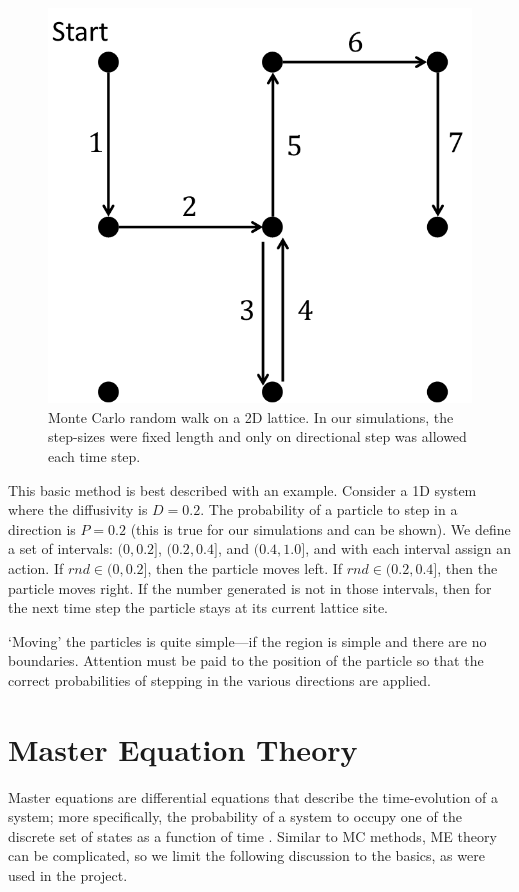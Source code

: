 	\begin{figure}[h]
		\centering
		\includegraphics[width=0.5\linewidth]{../images/mc-random-walk}
		\caption[Monte Carlo random walk on a 2D lattice]{Monte Carlo random walk on a 2D lattice. In our simulations, the step-sizes were fixed length and only on directional step was allowed each time step.}
		\label{fig:mc-random-walk}
	\end{figure}

	This basic method is best described with an example. Consider a 1D system where the diffusivity is $ D = 0.2 $. The probability of a particle to step in a direction is $ P = 0.2 $ (this is true for our simulations and can be shown). We define a set of intervals: $ (0,0.2] $, $ (0.2,0.4] $, and $ (0.4,1.0] $, and with each interval assign an action. If $ rnd \in (0,0.2] $, then the particle moves left. If $ rnd \in (0.2,0.4] $, then the particle moves right. If the number generated is not in those intervals, then for the next time step the particle stays at its current lattice site.
	
	`Moving' the particles is quite simple---if the region is simple and there are no boundaries. Attention must be paid to the position of the particle so that the correct probabilities of stepping in the various directions are applied.
	
\section{Master Equation Theory}
\label{sec:intro-me}
	
	Master equations are differential equations that describe the time-evolution of a system; more specifically, the probability of a system to occupy one of the discrete set of states as a function of time \citep{master-equations}. Similar to MC methods, ME theory can be complicated, so we limit the following discussion to the basics, as were used in the project. 
	
